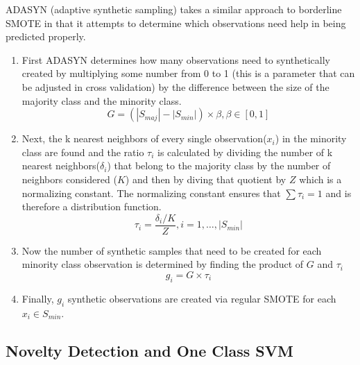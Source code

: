 \documentclass[a4paper]{article}
\begin{document}
ADASYN (adaptive synthetic sampling) takes a similar approach to borderline SMOTE in that it attempts to determine which observations need help in being predicted properly. 
\begin{enumerate}
\item First ADASYN determines how many observations need to synthetically created by multiplying some number from 0 to 1 (this is a parameter that can be adjusted in cross validation) by the difference between the size of the majority class and the minority class.
$$G=(|S_{maj}|-|S_{min}|)\times\beta, \beta\in[0,1]$$
\item Next, the k nearest neighbors of every single observation($x_i$) in the minority class are found and the ratio $\tau_i$ is calculated by dividing the number of k nearest neighbors($\delta_i$) that belong to the majority class by the number of neighbors considered ($K$) and then by diving that quotient by $Z$ which is a normalizing constant. The normalizing constant ensures that $\sum\tau_i=1$ and is therefore a distribution function.
 $$\tau_i=\frac{\delta_i/K}{Z}, i=1,\dots,|S_{min}|$$
\item Now the number of synthetic samples that need to be created for each minority class observation is determined by finding the product of $G$ and $\tau_i$
$$g_i=G\times\tau_i$$
\item Finally, $g_i$ synthetic observations are created via regular SMOTE for each $x_i\in S_{min}$.
\end{enumerate}

\subsection{Novelty Detection and One Class SVM}
\end{document}

